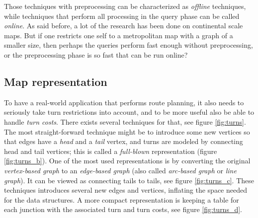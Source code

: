 \documentclass[../main.tex]{subfiles}
\begin{document}
Those techniques with preprocessing can be characterized as \emph{offline} techniques, while techniques that perform all processing in the query phase can be called \emph{online}. As said before, a lot of the research has been done on continental scale maps. But if one restricts one self to a metropolitan map with a graph of a smaller size, then perhaps the queries perform fast enough without preprocessing, or the preprocessing phase is so fast that can be run online?

\subsection{Map representation}
To have a real-world application that performs route planning, it also needs to seriously take turn restrictions into account, and to be more useful also be able to handle \emph{turn costs}. There exists several techniques for that, see figure \ref{fig:turns}. The most straight-forward technique might be to introduce some new vertices so that edges have a \emph{head} and a \emph{tail} vertex, and turns are modeled by connecting head and tail vertices; this is called a \emph{full-blown} representation (figure \ref{fig:turns_b}). One of the most used representations is by converting the original \emph{vertex-based graph} to an \emph{edge-based graph} (also called \emph{arc-based graph} or \emph{line graph}). It can be viewed as connecting tails to tails, see figure \ref{fig:turns_c}. These techniques introduces several new edges and vertices, inflating the space needed for the data structures. A more compact representation is keeping a table for each junction with the associated turn and turn costs, see figure \ref{fig:turns_d}.
\end{document}
